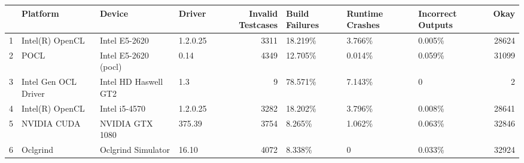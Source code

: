 \begin{tabular}{llllrlllr}
\toprule
{} &              Platform &                Device &    Driver &  Invalid Testcases & Build Failures & Runtime Crashes & Incorrect Outputs &   Okay \\
\midrule
1 &       Intel(R) OpenCL &         Intel E5-2620 &  1.2.0.25 &               3311 &        18.219\% &          3.766\% &            0.005\% &  28624 \\
2 &                  POCL &  Intel E5-2620 (pocl) &      0.14 &               4349 &        12.705\% &          0.014\% &            0.059\% &  31099 \\
3 &  Intel Gen OCL Driver &  Intel HD Haswell GT2 &       1.3 &                  9 &        78.571\% &          7.143\% &                 0 &      2 \\
4 &       Intel(R) OpenCL &         Intel i5-4570 &  1.2.0.25 &               3282 &        18.202\% &          3.796\% &            0.008\% &  28641 \\
5 &           NVIDIA CUDA &       NVIDIA GTX 1080 &    375.39 &               3754 &         8.265\% &          1.062\% &            0.063\% &  32846 \\
6 &              Oclgrind &    Oclgrind Simulator &     16.10 &               4072 &         8.338\% &               0 &            0.033\% &  32924 \\
\bottomrule
\end{tabular}
